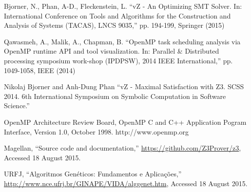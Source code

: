 \begin{thebibliography}{5}
Bjorner, N., Phan, A-D., Fleckenstein, L. ``{vZ - An Optimizing SMT Solver. In: International Conference on Tools and Algorithms for the Construction and Analysis of Systems (TACAS), LNCS 9035},'' pp. 194-199, Springer (2015)

Qawasmeh, A., Malik, A., Chapman, B. ``{OpenMP task scheduling analysis via OpenMP runtime API and tool visualization. In: Parallel \& Distributed processing symposium work-shop (IPDPSW), 2014 IEEE International},'' pp. 1049-1058, IEEE (2014)

Nikolaj Bjorner and Anh-Dung Phan ``{vZ - Maximal Satisfaction with Z3. SCSS 2014. 6th International Symposium on Symbolic Computation in Software Science.}''

OpenMP Architecture Review Board, OpenMP C and C++
Application Pogram Interface, Version 1.0, October 1998.
http://www.openmp.org

Magellan, ``{Source code and documentation},''
  \url{https://github.com/Z3Prover/z3}, Accessed 18 August 2015.
  
URFJ, ``{Algoritmos Genéticos: Fundamentos e Aplicações},''
  \url{http://www.nce.ufrj.br/GINAPE/VIDA/alggenet.htm}, Accessed 18 August 2015.

\end{thebibliography}




